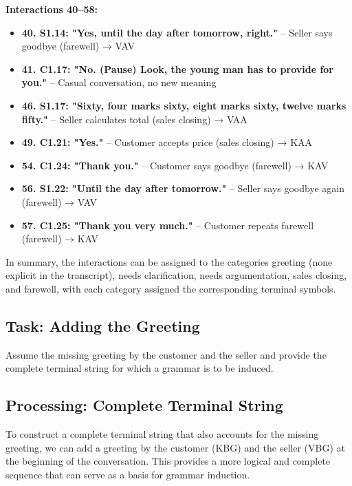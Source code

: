 \documentclass[
]{article}
\begin{document}
\textbf{Interactions 40--58:}

\begin{itemize}
\item
  \textbf{40. S1.14: "Yes, until the day after tomorrow, right."} -- Seller says goodbye (farewell) → VAV
\item
  \textbf{41. C1.17: "No. (Pause) Look, the young man has to provide for you."} -- Casual conversation, no new meaning
\item
  \textbf{46. S1.17: "Sixty, four marks sixty, eight marks sixty, twelve marks fifty."} -- Seller calculates total (sales closing) → VAA
\item
  \textbf{49. C1.21: "Yes."} -- Customer accepts price (sales closing) → KAA
\item
  \textbf{54. C1.24: "Thank you."} -- Customer says goodbye (farewell) → KAV
\item
  \textbf{56. S1.22: "Until the day after tomorrow."} -- Seller says goodbye again (farewell) → VAV
\item
  \textbf{57. C1.25: "Thank you very much."} -- Customer repeats farewell (farewell) → KAV
\end{itemize}

In summary, the interactions can be assigned to the categories greeting (none explicit in the transcript), needs clarification, needs argumentation, sales closing, and farewell, with each category assigned the corresponding terminal symbols.

\subsection{Task: Adding the Greeting}\label{task-adding-the-greeting}

Assume the missing greeting by the customer and the seller and provide the complete terminal string for which a grammar is to be induced.

\subsection{Processing: Complete Terminal String}\label{processing-complete-terminal-string}

To construct a complete terminal string that also accounts for the missing greeting, we can add a greeting by the customer (KBG) and the seller (VBG) at the beginning of the conversation. This provides a more logical and complete sequence that can serve as a basis for grammar induction.
\end{document}
